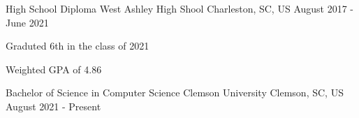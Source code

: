 

\begin{cventries}

  \cventry
    {High School Diploma} %
    {West Ashley High Shool} %
    {Charleston, SC, US} %
    {August 2017 - June 2021} %
    {
      \begin{cvitems} %
        \item {Graduted 6th in the class of 2021}
        \item {Weighted GPA of 4.86}
      \end{cvitems}
    }

  \cventry
    {Bachelor of Science in Computer Science} %
    {Clemson University} %
    {Clemson, SC, US} %
    {August 2021 - Present} %
    {
    }

\end{cventries}
